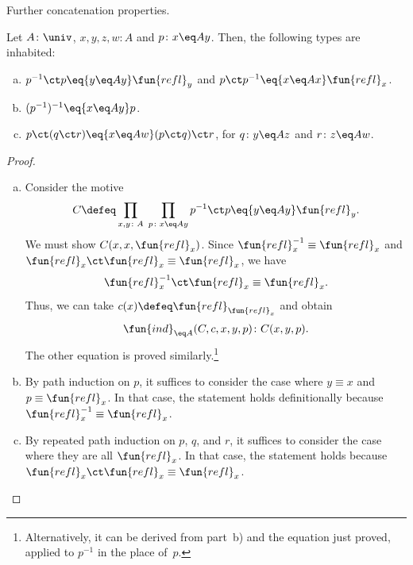 \begin{lpar}{Further concatenation properties.}

\begin{lem}\label{lem:concat}
    Let\/ $A\colon\univ$,\/ $x,y,z, w\colon A$ and\/ $p\colon x\eq Ay$. Then, the following types are inhabited:
    \begin{enumerate}[a),font=\upshape]
        \item $p^{-1}\ct p\eq{y\eq Ay}\fun{refl}_y$ and\/ $p\ct p^{-1}\eq{x\eq Ax}\fun{refl}_x$.
        \item $(p^{-1})^{-1}\eq{x\eq Ay}p$.
        \item $p\ct(q\ct r)\eq{x\eq Aw}(p\ct q)\ct r$, for\/ $q\colon y\eq Az$ and\/ $r\colon z\eq Aw$.
    \end{enumerate}
\end{lem}

\begin{proof}${}$
    \begin{enumerate}[a),font=\upshape]
        \item Consider the motive
        \[
            C\defeq\prod_{x,y\colon A}\;\prod_{p\colon x\eq Ay}
                p^{-1}\ct p\eq{y\eq Ay}\fun{refl}_y.
        \]
        We must show $C(x,x,\fun{refl}_x)$. Since $\fun{refl}_x^{-1}\equiv\fun{refl}_x$ and $\fun{refl}_x\ct\fun{refl}_x\equiv\fun{refl}_x$, we have
        \[
             \fun{refl}_x^{-1}\ct\fun{refl}_x \equiv \fun{refl}_x.
        \]
        Thus, we can take $c(x)\defeq\fun{refl}_{\fun{refl}_x}$ and obtain
        \[
            \fun{ind}_{\eq A}(C,c,x,y,p)\colon C(x,y,p).
        \]
        The other equation is proved similarly.\footnote{Alternatively, it can be derived from part~b) and the equation just proved, applied to $p^{-1}$ in the place of~$p$.}

        \item By path induction on $p$, it suffices to consider the case where $y\equiv x$ and $p\equiv\fun{refl}_x$. In that case, the statement holds definitionally because $\fun{refl}_x^{-1}\equiv\fun{refl}_x$.

        \item By repeated path induction on $p$, $q$, and $r$, it suffices to consider the case where they are all $\fun{refl}_x$. In that case, the statement holds because $\fun{refl}_x\ct\fun{refl}_x\equiv\fun{refl}_x$. \qedhere
    \end{enumerate}
\end{proof}
    
\end{lpar}

